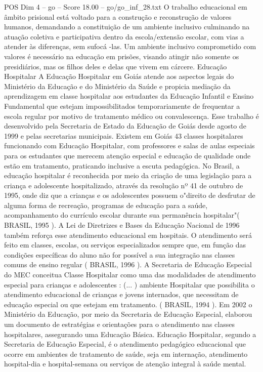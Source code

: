 \begin{textsample}{POS Dim 4 – go – Score 18.00 – go/go\_inf\_28.txt}
O trabalho educacional em âmbito prisional está voltado para a construção e reconstrução de valores humanos, demandando a constituição de um ambiente inclusivo culminando na atuação coletiva e participativa dentro da escola/extensão escolar, com vias a atender às diferenças, sem sufocá -las.
Um ambiente inclusivo comprometido com valores é necessário na educação em prisões, visando atingir não somente os presidiários, mas os filhos deles e delas que vivem em cárcere.
Educação Hospitalar A Educação Hospitalar em Goiás atende aos aspectos legais do Ministério da Educação e do Ministério da Saúde e propicia mediação da aprendizagem em classe hospitalar aos estudantes da Educação Infantil e Ensino Fundamental que estejam impossibilitados temporariamente de frequentar a escola regular por motivo de tratamento médico ou convalescença.
Esse trabalho é desenvolvido pela Secretaria de Estado da Educação de Goiás desde agosto de 1999 e pelas secretarias municipais.
Existem em Goiás 43 classes hospitalares funcionando com Educação Hospitalar, com professores e salas de aulas especiais para os estudantes que merecem atenção especial e educação de qualidade onde estão em tratamento, praticando inclusive a escuta pedagógica.
No Brasil, a educação hospitalar é reconhecida por meio da criação de uma legislação para a criança e adolescente hospitalizado, através da resolução nº 41 de outubro de 1995, onde diz que a crianças e os adolescentes possuem o"direito de desfrutar de alguma forma de recreação, programas de educação para a saúde, acompanhamento do currículo escolar durante sua permanência hospitalar"( BRASIL, 1995 ).
A Lei de Diretrizes e Bases da Educação Nacional de 1996 também reforça esse atendimento educacional em hospitais.
O atendimento será feito em classes, escolas, ou serviços especializados sempre que, em função das condições específicas do aluno não for possível a sua integração nas classes comuns de ensino regular ( BRASIL, 1996 ).
A Secretaria de Educação Especial do MEC conceitua Classe Hospitalar como uma das modalidades de atendimento especial para crianças e adolescentes : (... ) ambiente Hospitalar que possibilita o atendimento educacional de crianças e jovens internados, que necessitam de educação especial ou que estejam em tratamento. ( BRASIL, 1994 ).
Em 2002 o Ministério da Educação, por meio da Secretaria de Educação Especial, elaborou um documento de estratégias e orientações para o atendimento nas classes hospitalares, assegurando uma Educação Básica.
Educação Hospitalar, segundo a Secretaria de Educação Especial, é o atendimento pedagógico educacional que ocorre em ambientes de tratamento de saúde, seja em internação, atendimento hospital-dia e hospital-semana ou serviços de atenção integral à saúde mental.

\end{textsample}
